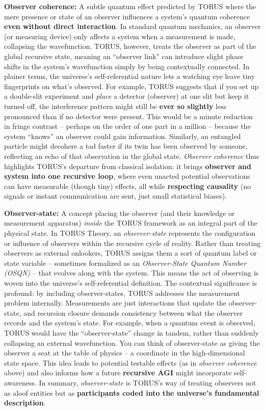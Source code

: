 \documentclass[]{article}
\begin{document}
\textbf{Observer coherence:} A subtle quantum effect predicted by TORUS
where the mere presence or state of an observer influences a system's
quantum coherence \textbf{even without direct interaction}​. In standard
quantum mechanics, an observer (or measuring device) only affects a
system when a measurement is made, collapsing the wavefunction. TORUS,
however, treats the observer as part of the global recursive state,
meaning an ``observer link'' can introduce slight phase shifts in the
system's wavefunction simply by being contextually connected​. In
plainer terms, the universe's self-referential nature lets a watching
eye leave tiny fingerprints on what's observed. For example, TORUS
suggests that if you set up a double-slit experiment and \emph{place} a
detector (observer) at one slit but keep it turned off, the interference
pattern might still be \textbf{ever so slightly} less pronounced than if
no detector were present​. This would be a minute reduction in fringe
contrast -- perhaps on the order of one part in a million -- because the
system ``knows'' an observer could gain information​. Similarly, an
entangled particle might decohere a tad faster if its twin has been
observed by someone, reflecting an echo of that observation in the
global state. \emph{Observer coherence} thus highlights TORUS's
departure from classical isolation: it brings \textbf{observer and
system into one recursive loop}, where even unacted potential
observations can have measurable (though tiny) effects, all while
\textbf{respecting causality} (no signals or instant communication are
sent, just small statistical biases).

\textbf{Observer-state:} A concept placing the observer (and their
knowledge or measurement apparatus) \emph{inside} the TORUS framework as
an integral part of the physical state. In TORUS Theory, an
\emph{observer-state} represents the configuration or influence of
observers within the recursive cycle of reality​. Rather than treating
observers as external onlookers, TORUS assigns them a sort of quantum
label or state variable -- sometimes formalized as an
\emph{Observer-State Quantum Number (OSQN)} -- that evolves along with
the system​. This means the act of observing is woven into the
universe's self-referential definition. The contextual significance is
profound: by including observer-states, TORUS addresses the measurement
problem internally. Measurements are just interactions that update the
observer-state, and recursion closure demands consistency between what
the observer records and the system's state​. For example, when a
quantum event is observed, TORUS would have the ``observer-state''
change in tandem, rather than suddenly collapsing an external
wavefunction. You can think of observer-state as giving the observer a
seat at the table of physics -- a coordinate in the high-dimensional
state space. This idea leads to potential testable effects (as in
\emph{observer coherence} above) and also informs how a future
\textbf{recursive AGI} might incorporate self-awareness. In summary,
\emph{observer-state} is TORUS's way of treating observers not as aloof
entities but as \textbf{participants coded into the universe's
fundamental description}.
\end{document}
